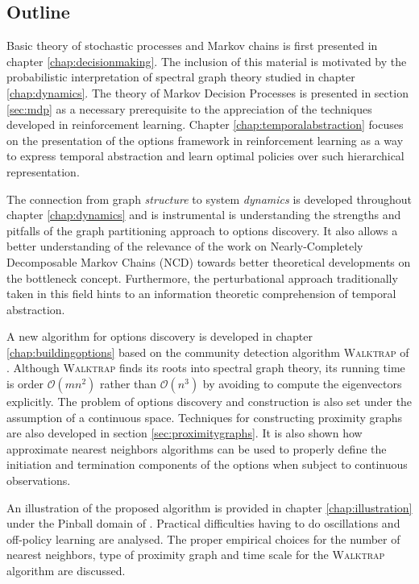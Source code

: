 \subsection{Outline}

Basic theory of stochastic processes and Markov chains is first presented in chapter \ref{chap:decisionmaking}. The inclusion of this material is motivated by the probabilistic interpretation of spectral graph theory studied in chapter \ref{chap:dynamics}. The theory of Markov Decision Processes is presented in section \ref{sec:mdp} as a necessary prerequisite to the appreciation of the techniques developed in reinforcement learning. Chapter \ref{chap:temporalabstraction} focuses on the presentation of the options framework \cite{Sutton1999} in reinforcement learning as a way to express temporal abstraction and learn optimal policies over such hierarchical representation. 

The connection from graph \textit{structure} to system \textit{dynamics} is developed throughout chapter \ref{chap:dynamics} and is instrumental is understanding the strengths and pitfalls of the graph partitioning approach to options discovery. It also allows a better understanding of the relevance of the work on Nearly-Completely Decomposable Markov Chains (NCD) towards better theoretical developments on the bottleneck concept. Furthermore, the perturbational approach traditionally taken in this field hints to an information theoretic comprehension of temporal abstraction. 

A new algorithm for options discovery is developed in chapter \ref{chap:buildingoptions} based on the community detection algorithm \textsc{Walktrap} of \cite{Pons2005}. Although \textsc{Walktrap} finds its roots into spectral graph theory, its running time is order $\mathcal{O}(mn^2)$ rather than $\mathcal{O}(n^3)$ by avoiding to compute the eigenvectors explicitly. The problem of options discovery and construction is also set under the assumption of a continuous space. Techniques for constructing proximity graphs are also developed in section \ref{sec:proximitygraphs}. It is also shown how approximate nearest neighbors algorithms can be used to properly define the initiation and termination components of the options when subject to continuous observations.

An illustration of the proposed algorithm is provided in chapter \ref{chap:illustration} under the Pinball domain of \cite{Konidaris2009}. Practical difficulties having to do oscillations and off-policy learning are analysed. The proper empirical choices for the number of nearest neighbors, type of proximity graph and time scale for the \textsc{Walktrap} algorithm are discussed.